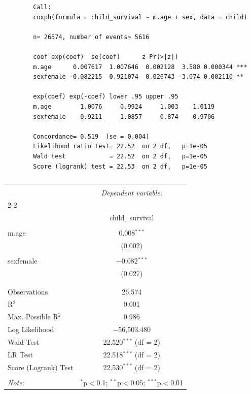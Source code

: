 \documentclass[12pt,letterpaper]{article}
\begin{document}
	\tiny \begin{BVerbatim}
		Call:
		coxph(formula = child_survival ~ m.age + sex, data = child)
		
		n= 26574, number of events= 5616
		
		coef exp(coef)  se(coef)      z Pr(>|z|)
		m.age      0.007617  1.007646  0.002128  3.580 0.000344 ***
		sexfemale -0.082215  0.921074  0.026743 -3.074 0.002110 **
		
		exp(coef) exp(-coef) lower .95 upper .95
		m.age        1.0076     0.9924     1.003    1.0119
		sexfemale    0.9211     1.0857     0.874    0.9706
		
		Concordance= 0.519  (se = 0.004)
		Likelihood ratio test= 22.52  on 2 df,   p=1e-05
		Wald test            = 22.52  on 2 df,   p=1e-05
		Score (logrank) test = 22.53  on 2 df,   p=1e-05
	\end{BVerbatim}
	
	\normalsize
	
	\begin{table}[!htbp] \centering 
		\caption{} 
		\label{} 
		\begin{tabular}{@{\extracolsep{5pt}}lc} 
			\\[-1.8ex]\hline 
			\hline \\[-1.8ex] 
			& \multicolumn{1}{c}{\textit{Dependent variable:}} \\ 
			\cline{2-2} 
			\\[-1.8ex] & child\_survival \\ 
			\hline \\[-1.8ex] 
			m.age & 0.008$^{***}$ \\ 
			& (0.002) \\ 
			& \\ 
			sexfemale & $-$0.082$^{***}$ \\ 
			& (0.027) \\ 
			& \\ 
			\hline \\[-1.8ex] 
			Observations & 26,574 \\ 
			R$^{2}$ & 0.001 \\ 
			Max. Possible R$^{2}$ & 0.986 \\ 
			Log Likelihood & $-$56,503.480 \\ 
			Wald Test & 22.520$^{***}$ (df = 2) \\ 
			LR Test & 22.518$^{***}$ (df = 2) \\ 
			Score (Logrank) Test & 22.530$^{***}$ (df = 2) \\ 
			\hline 
			\hline \\[-1.8ex] 
			\textit{Note:}  & \multicolumn{1}{r}{$^{*}$p$<$0.1; $^{**}$p$<$0.05; $^{***}$p$<$0.01} \\ 
		\end{tabular} 
	\end{table} 
	
\end{document}
